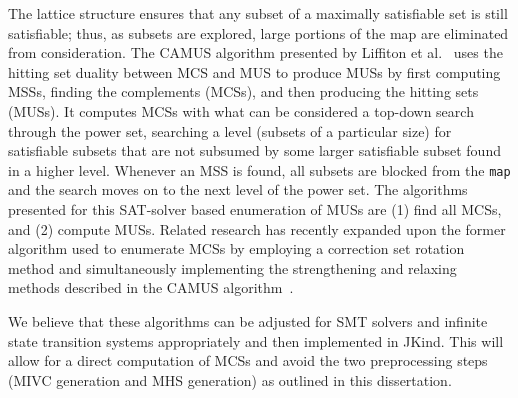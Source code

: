 The lattice structure ensures that any subset of a maximally satisfiable set is still satisfiable; thus, as subsets are explored, large portions of the map are eliminated from consideration. The CAMUS algorithm presented by Liffiton et al.~\cite{liffiton2005finding} uses the hitting set duality between MCS and MUS to produce MUSs by first computing MSSs, finding the complements (MCSs), and then producing the hitting sets (MUSs). It computes MCSs with what can be considered a top-down search through the power set, searching a level (subsets of a particular size) for satisfiable subsets that are not subsumed by some larger satisfiable subset found in a higher level. Whenever an MSS is found, all subsets are blocked from the \texttt{map} and the search moves on to the next level of the power set. The algorithms presented for this SAT-solver based enumeration of MUSs are (1) find all MCSs, and (2) compute MUSs. Related research has recently expanded upon the former algorithm used to enumerate MCSs by employing a correction set rotation method and simultaneously implementing the strengthening and relaxing methods described in the CAMUS algorithm~\cite{narodytska2018core}.  

We believe that these algorithms can be adjusted for SMT solvers and infinite state transition systems appropriately and then implemented in JKind. This will allow for a direct computation of MCSs and avoid the two preprocessing steps (MIVC generation and MHS generation) as outlined in this dissertation. 




